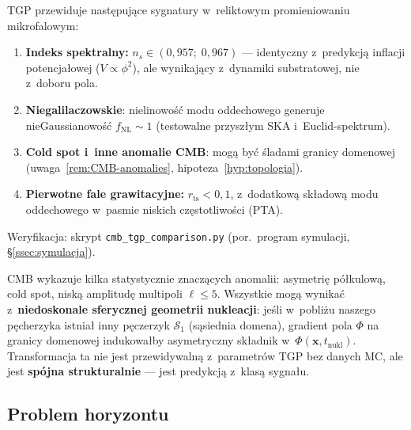 \begin{corollary}\label{cor:CMB-signatures}
TGP przewiduje nast\k{e}puj\k{a}ce sygnatury w~reliktowym
promieniowaniu mikrofalowym:
\begin{enumerate}[nosep]
  \item \textbf{Indeks spektralny:} $n_s \in (0{,}957;\;0{,}967)$
    --- identyczny z~predykcj\k{a} inflacji potencja\l{}owej ($V \propto \phi^2$),
    ale wynikaj\k{a}cy z~dynamiki substratowej, nie z~doboru pola.
  \item \textbf{Niegalilaczowskie}: nielinowo\'s\'c modu oddechowego
    generuje nieGaussianowo\'s\'c $f_\mathrm{NL} \sim 1$
    (testowalne przysz\l{}ym SKA i~Euclid-spektrum).
  \item \textbf{Cold spot i~inne anomalie CMB}: mog\k{a}
    by\'c \'sladami granicy domenowej (uwaga~\ref{rem:CMB-anomalies},
    hipoteza~\ref{hyp:topologia}).
  \item \textbf{Pierwotne fale grawitacyjne:} $r_\mathrm{ts} < 0{,}1$,
    z~dodatkow\k{a} sk\l{}adow\k{a} modu oddechowego w~pasmie
    niskich cz\k{e}stotliwo\'sci (PTA).
\end{enumerate}
Weryfikacja: skrypt \texttt{cmb\_tgp\_comparison.py}
(por.\ program symulacji, \S\ref{ssec:symulacja}).
\end{corollary}

\begin{remark}\label{rem:CMB-anomalies}
CMB wykazuje kilka statystycznie znacz\k{a}cych anomalii:
asymetri\k{e} p\'o\l{}kulow\k{a}, cold spot, nisk\k{a} amplitud\k{e}
multipoli $\ell \leq 5$. Wszystkie mog\k{a}
wynika\'c z~\textbf{niedoskonale sferycznej geometrii nukleacji}:
je\'sli w~pobli\.zu naszego p\k{e}cherzyka istnia\l{} inny
p\k{e}czerzyk $\mathcal{S}_1$ (s\k{a}siednia domena),
gradient pola $\Phi$ na granicy domenowej indukowa\l{}by
asymetryczny sk\l{}adnik w~$\Phi(\mathbf{x}, t_\mathrm{nukl})$.
Transformacja ta nie jest przewidywaln\k{a} z~parametr\'ow
TGP bez danych MC, ale jest \textbf{sp\'ojna strukturalnie}
--- jest predykcj\k{a} z~klas\k{a} sygna\l{}u.
\end{remark}

\subsection{Problem horyzontu}%
\label{app:G-horyzont}

